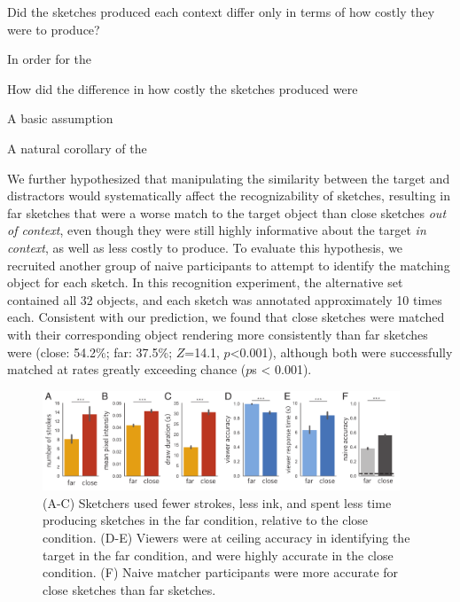\documentclass[9pt,twocolumn,twoside]{pnas-new}
\newcommand{\mwu}[1]{{\color{green}{[mwu: #1]}}}
\begin{document}

Did the sketches produced each context differ only in terms of how costly they were to produce? 

In order for the 

How did the difference in how costly the sketches produced were

A basic assumption

A natural corollary of the 


We further hypothesized that manipulating the similarity between the target and distractors would systematically affect the recognizability of sketches, resulting in far sketches that were a worse match to the target object than close sketches \textit{out of context}, even though they were still highly informative about the target \textit{in context}, as well as less costly to produce.
To evaluate this hypothesis, we recruited another group of naive participants to attempt to identify the matching object for each sketch.
In this recognition experiment, the alternative set contained all 32 objects, and each sketch was annotated approximately 10 times each. Consistent with our prediction, we found that close sketches were matched with their corresponding object rendering more consistently than far sketches were (close: 54.2\%; far: 37.5\%; $Z$=14.1, $p$<0.001), although both were successfully matched at rates greatly exceeding chance ($p$s < 0.001).

\begin{figure}[htbp]
\centering
\includegraphics[width=0.95\textwidth]{figures/3_behavioral_performance.pdf}
\caption{(A-C) Sketchers used fewer strokes, less ink, and spent less time producing sketches in the far condition, relative to the close condition. (D-E) Viewers were at ceiling accuracy in identifying the target in the far condition, and were highly accurate in the close condition. (F) Naive matcher participants were more accurate for close sketches than far sketches.}
\label{task_performance}
\end{figure}
\end{document}
